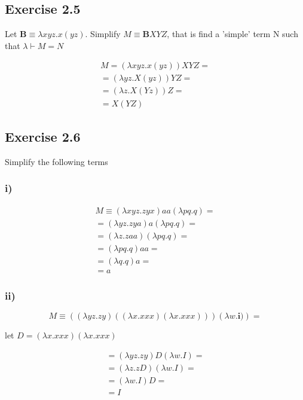 \documentclass[11pt]{article}
\begin{document}
\subsection*{Exercise 2.5}
Let $\mathbf{B} \equiv \lambda xyz.x(yz)$. Simplify $M \equiv \mathbf{B}XYZ$, that is find a 'simple' term N such that $\lambda \vdash M = N$

\begin{gather*}
M = (\lambda xyz.x(yz))XYZ = \\
= (\lambda yz.X(yz))YZ = \\
= (\lambda z.X(Yz))Z = \\
= X(YZ)
\end{gather*}


\subsection*{Exercise 2.6}
Simplify the following terms

\subsubsection*{i)}
\begin{gather*}
M \equiv (\lambda xyz.zyx)aa(\lambda pq.q) = \\
= (\lambda yz.zya)a(\lambda pq.q) = \\
= (\lambda z.zaa)(\lambda pq.q) = \\
= (\lambda pq.q)aa = \\
= (\lambda q.q)a = \\
= a
\end{gather*}


\clearpage
\subsubsection*{ii)}
\[
M \equiv ((\lambda yz.zy)((\lambda x.xxx)(\lambda x.xxx)))(\lambda w. \mathbf{i)}) =
\]


%				
		
let $D = (\lambda x.xxx)(\lambda x.xxx)$

\begin{gather*}
 = (\lambda yz.zy)D(\lambda w.I) = \\
= (\lambda z.zD)(\lambda w.I) = \\
= (\lambda w. I)D = \\
= I
\end{gather*}
\end{document}

